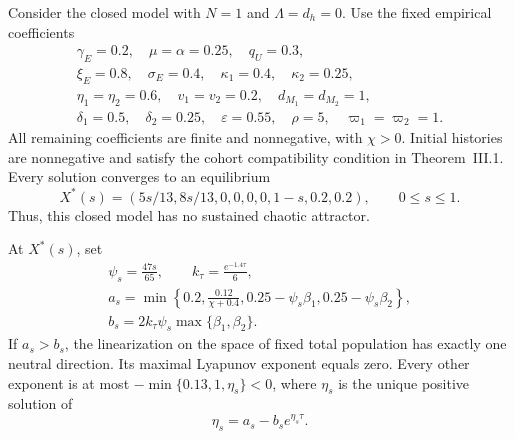 \begin{theorem}
\label{thm:lyapunov_quantification}
Consider the closed model with $N=1$ and $\Lambda=d_h=0$.
Use the fixed empirical coefficients
\[
\begin{gathered}
\gamma_E=0.2,\quad \mu=\alpha=0.25,\quad q_U=0.3,\\
\xi_E=0.8,\quad \sigma_E=0.4,\quad
\kappa_1=0.4,\quad \kappa_2=0.25,\\
\eta_1=\eta_2=0.6,\quad v_1=v_2=0.2,\quad
d_{M_1}=d_{M_2}=1,\\
\delta_1=0.5,\quad \delta_2=0.25,\quad
\varepsilon=0.55,\quad \rho=5,\quad
\varpi_1=\varpi_2=1.
\end{gathered}
\]
All remaining coefficients are finite and nonnegative, with $\chi>0$.
Initial histories are nonnegative and satisfy the cohort compatibility
condition in Theorem~III.1.
Every solution converges to an equilibrium
\begin{equation}
X^*(s)=
(5s/13,8s/13,0,0,0,0,1-s,0.2,0.2),
\qquad 0\le s\le1.
\label{eq:closed_equilibrium_family}
\end{equation}
Thus, this closed model has no sustained chaotic attractor.

At $X^*(s)$, set
\[
\begin{gathered}
\psi_s=\frac{47s}{65},\qquad
k_\tau=\frac{e^{-1.4\tau}}{6},\\
a_s=\min\left\{0.2,\frac{0.12}{\chi+0.4},
0.25-\psi_s\beta_1,0.25-\psi_s\beta_2\right\},\\
b_s=2k_\tau\psi_s\max\{\beta_1,\beta_2\}.
\end{gathered}
\]
If $a_s>b_s$, the linearization on the space of fixed total population
has exactly one neutral direction.
Its maximal Lyapunov exponent equals zero.
Every other exponent is at most
$-\min\{0.13,1,\eta_s\}<0$, where $\eta_s$ is the unique positive solution of
\begin{equation}
\eta_s=a_s-b_s e^{\eta_s\tau}.
\label{eq:lyapunov_decay_rate}
\end{equation}
\end{theorem}

